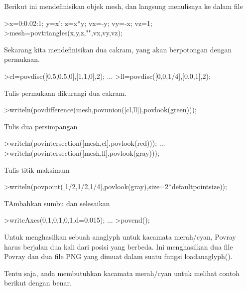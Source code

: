 \documentclass[a4paper,10pt]{article}
\begin{document}
\begin{eulernotebook}
\begin{eulercomment}
\begin{eulercomment}
\begin{eulercomment}
Berikut ini mendefinisikan objek mesh, dan langsung menulisnya ke
dalam file
\end{eulercomment}
\begin{eulerprompt}
>x=0:0.02:1; y=x'; z=x*y; vx=-y; vy=-x; vz=1;
>mesh=povtriangles(x,y,z,"",vx,vy,vz);
\end{eulerprompt}
\begin{eulercomment}
Sekarang kita mendefinisikan dua cakram, yang akan berpotongan dengan
permukaan.
\end{eulercomment}
\begin{eulerprompt}
>cl=povdisc([0.5,0.5,0],[1,1,0],2); ...
>ll=povdisc([0,0,1/4],[0,0,1],2);
\end{eulerprompt}
\begin{eulercomment}
Tulis permukaan dikurangi dua cakram.
\end{eulercomment}
\begin{eulerprompt}
>writeln(povdifference(mesh,povunion([cl,ll]),povlook(green)));
\end{eulerprompt}
\begin{eulercomment}
Tulis dua persimpangan
\end{eulercomment}
\begin{eulerprompt}
>writeln(povintersection([mesh,cl],povlook(red))); ...
>writeln(povintersection([mesh,ll],povlook(gray)));
\end{eulerprompt}
\begin{eulercomment}
Tulis titik maksimum
\end{eulercomment}
\begin{eulerprompt}
>writeln(povpoint([1/2,1/2,1/4],povlook(gray),size=2*defaultpointsize));
\end{eulerprompt}
\begin{eulercomment}
TAmbahkan sumbu dan selesaikan
\end{eulercomment}
\begin{eulerprompt}
>writeAxes(0,1,0,1,0,1,d=0.015); ...
>povend();
\end{eulerprompt}
\begin{eulercomment}
Untuk menghasilkan sebuah anaglyph untuk kacamata merah/cyan, Povray
harus berjalan dua kali dari posisi yang berbeda. Ini menghasilkan dua
file Povray dan dua file PNG yang dimuat dalam suatu fungsi
loadanaglyph().

Tentu saja, anda membutuhkan kacamata merah/cyan untuk melihat contoh
berikut dengan benar.


\end{eulercomment}
\end{eulercomment}
\end{eulercomment}
\end{eulernotebook}
\end{document}
